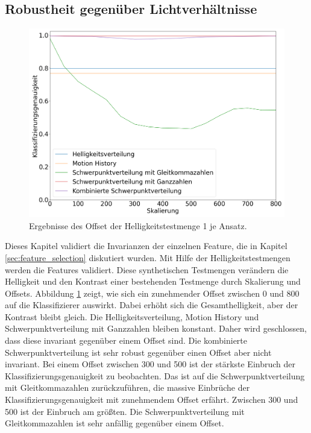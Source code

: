 \subsection{Robustheit gegenüber Lichtverhältnisse}
\label{sec:brightness_eval}
\begin{figure}[h!]
    \centering
    \includegraphics[width=\linewidth]{images/brightness_offset.png}
    \caption{Ergebnisse des Offset der Helligkeitstestmenge 1 je Ansatz.}
    \label{fig:brightness_offset}
\end{figure}
Dieses Kapitel validiert die Invarianzen der einzelnen Feature, die in Kapitel \ref{sec:feature_selection} diskutiert wurden. Mit Hilfe der Helligkeitstestmengen werden die Features validiert. Diese synthetischen Testmengen
verändern die Helligkeit und den Kontrast einer bestehenden Testmenge durch Skalierung und Offsets.
\newline
\newline
Abbildung \ref{fig:brightness_offset} zeigt, wie sich ein zunehmender Offset zwischen 0 und 800 auf die Klassifizierer auswirkt. Dabei erhöht sich die Gesamthelligkeit, aber der Kontrast bleibt gleich.
Die Helligkeitsverteilung, Motion History und Schwerpunktverteilung mit Ganzzahlen bleiben
konstant. Daher wird geschlossen, dass diese invariant gegenüber einem Offset sind. Die kombinierte Schwerpunktverteilung ist sehr robust gegenüber einen Offset aber nicht invariant. Bei einem Offset zwischen 300
und 500 ist der stärkste Einbruch der Klassifizierungsgenauigkeit zu beobachten. Das ist auf die Schwerpunktverteilung mit Gleitkommazahlen zurückzuführen, die massive Einbrüche der Klassifizierungsgenauigkeit
mit zunehmendem Offset erfährt. Zwischen 300 und 500 ist der Einbruch am größten. Die Schwerpunktverteilung mit Gleitkommazahlen ist sehr anfällig gegenüber einem Offset.
